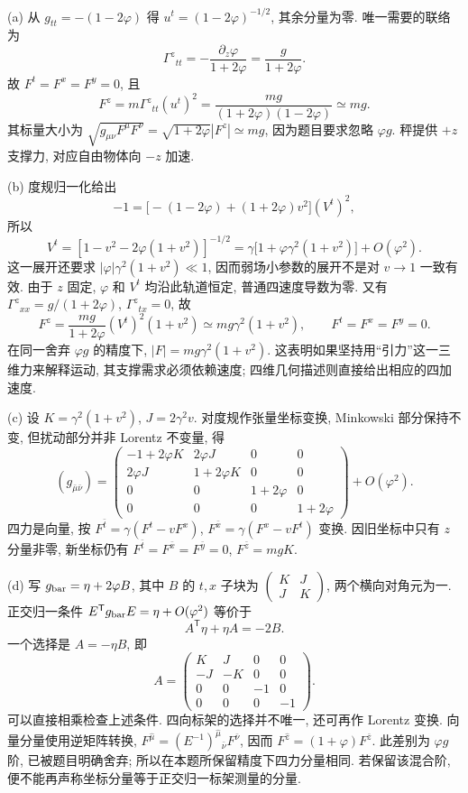 \begin{solution}
(a) 从 $g_{tt}=-(1-2\varphi)$ 得 $u^t=(1-2\varphi)^{-1/2}$, 其余分量为零. 唯一需要的联络为
\[
\Gamma^z{}_{tt}=-\frac{\partial_z\varphi}{1+2\varphi}
=\frac{g}{1+2\varphi}.
\]
故 $F^t=F^x=F^y=0$, 且
\[
F^z=m\Gamma^z{}_{tt}(u^t)^2
=\frac{mg}{(1+2\varphi)(1-2\varphi)}\simeq mg.
\]
其标量大小为 $\sqrt{g_{\mu\nu}F^\mu F^\nu}=\sqrt{1+2\varphi}|F^z|\simeq mg$, 因为题目要求忽略 $\varphi g$. 秤提供 $+z$ 支撑力, 对应自由物体向 $-z$ 加速.

(b) 度规归一化给出
\[
-1=\bigl[-(1-2\varphi)+(1+2\varphi)v^2\bigr](V^t)^2,
\]
所以
\[
V^t=\left[1-v^2-2\varphi(1+v^2)\right]^{-1/2}
=\gamma\bigl[1+\varphi\gamma^2(1+v^2)\bigr]+O(\varphi^2).
\]
这一展开还要求 $|\varphi|\gamma^2(1+v^2)\ll1$, 因而弱场小参数的展开不是对 $v\to1$ 一致有效. 由于 $z$ 固定, $\varphi$ 和 $V^t$ 均沿此轨道恒定, 普通四速度导数为零. 又有 $\Gamma^z{}_{xx}=g/(1+2\varphi)$, $\Gamma^z{}_{tx}=0$, 故
\[
F^z=\frac{mg}{1+2\varphi}(V^t)^2(1+v^2)
\simeq mg\gamma^2(1+v^2),\qquad F^t=F^x=F^y=0.
\]
在同一舍弃 $\varphi g$ 的精度下, $|F|=mg\gamma^2(1+v^2)$. 这表明如果坚持用“引力”这一三维力来解释运动, 其支撑需求必须依赖速度; 四维几何描述则直接给出相应的四加速度.

(c) 设 $K=\gamma^2(1+v^2)$, $J=2\gamma^2v$. 对度规作张量坐标变换, Minkowski 部分保持不变, 但扰动部分并非 Lorentz 不变量, 得
\[
(g_{\bar\mu\bar\nu})=
\begin{pmatrix}
-1+2\varphi K&2\varphi J&0&0\\
2\varphi J&1+2\varphi K&0&0\\
0&0&1+2\varphi&0\\
0&0&0&1+2\varphi
\end{pmatrix}+O(\varphi^2).
\]
四力是向量, 按 $F^{\bar t}=\gamma(F^t-vF^x)$, $F^{\bar x}=\gamma(F^x-vF^t)$ 变换. 因旧坐标中只有 $z$ 分量非零, 新坐标仍有 $F^{\bar t}=F^{\bar x}=F^{\bar y}=0$, $F^{\bar z}=mgK$.

(d) 写 $g_{\rm bar}=\eta+2\varphi B$, 其中 $B$ 的 $t,x$ 子块为 $\left(\begin{smallmatrix}K&J\\J&K\end{smallmatrix}\right)$, 两个横向对角元为一. 正交归一条件 $E^{\mathsf T}g_{\rm bar}E=\eta+O(\varphi^2)$ 等价于
\[
A^{\mathsf T}\eta+\eta A=-2B.
\]
一个选择是 $A=-\eta B$, 即
\[
A=\begin{pmatrix}
K&J&0&0\\
-J&-K&0&0\\
0&0&-1&0\\
0&0&0&-1
\end{pmatrix}.
\]
可以直接相乘检查上述条件. 四向标架的选择并不唯一, 还可再作 Lorentz 变换. 向量分量使用逆矩阵转换, $F^{\hat\mu}=(E^{-1})^{\hat\mu}{}_{\bar\nu}F^{\bar\nu}$, 因而 $F^{\hat z}=(1+\varphi)F^{\bar z}$. 此差别为 $\varphi g$ 阶, 已被题目明确舍弃; 所以在本题所保留精度下四力分量相同. 若保留该混合阶, 便不能再声称坐标分量等于正交归一标架测量的分量.
\end{solution}


